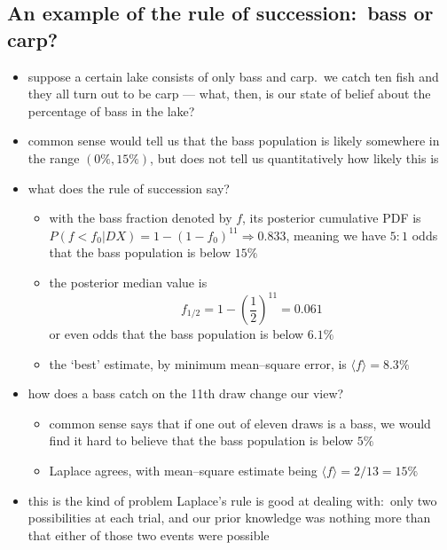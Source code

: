 \documentclass[../jaynes_prob_theory_notes.tex]{subfiles}
\begin{document}
            \subsection{An example of the rule of succession:\ bass or carp?}
                \begin{itemize} 
                    \item suppose a certain lake consists of only bass and carp.\ we catch ten fish and they all turn out to be carp --- what, then, is our state of belief about the percentage of bass in the lake?
                    \item common sense would tell us that the bass population is likely somewhere in the range \((0\%, 15\%)\), but does not tell us quantitatively how likely this is
                    \item what does the rule of succession say?
                        \begin{itemize} 
                            \item with the bass fraction denoted by \(f\), its posterior cumulative PDF is \(P(f<f_0 |DX) = 1 - {(1 - f_0)}^{11} \Rightarrow 0.833\), meaning we have \(5:1\) odds that the bass population is below \(15\%\)
                            \item the posterior median value is
                                \begin{equation*} 
                                    f_{1/2} = 1 - {\left( \frac{1}{2} \right)}^{11} = 0.061
                                \end{equation*}
                                or even odds that the bass population is below \(6.1\%\)
                            \item the `best' estimate, by minimum mean--square error, is \(\langle f \rangle = 8.3\%\)
                        \end{itemize}
                    \item how does a bass catch on the 11th draw change our view?
                        \begin{itemize} 
                            \item common sense says that if one out of eleven draws is a bass, we would find it hard to believe that the bass population is below \(5\%\)
                            \item Laplace agrees, with mean--square estimate being \(\langle f \rangle = 2/13 = 15\%\)
                        \end{itemize}
                    \item this is the kind of problem Laplace's rule is good at dealing with:\ only two possibilities at each trial, and our prior knowledge was nothing more than that either of those two events were possible
                \end{itemize}
\end{document}
